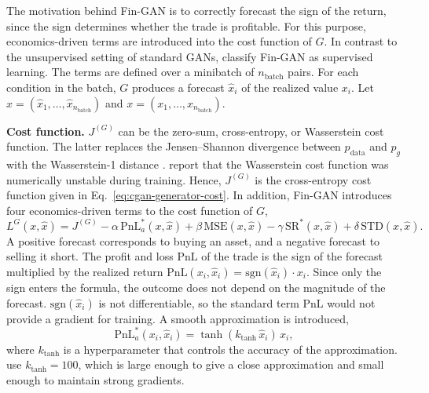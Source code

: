 The motivation behind Fin-GAN is to correctly forecast the sign of the return, since the sign determines whether the trade is profitable. For this purpose, economics-driven terms are introduced into the cost function of $G$. In contrast to the unsupervised setting of standard GANs, \textcite{vuleticFinGANForecastingClassifying2024} classify Fin-GAN as supervised learning. The terms are defined over a minibatch of $n_{\text{batch}}$ pairs. For each condition in the batch, $G$ produces a forecast $\hat{x}_i$ of the realized value $x_i$. Let $\hat{x}=(\hat{x}_1, \ldots, \hat{x}_{n_{\text{batch}}})$ and $x=(x_1, \ldots, x_{n_{\text{batch}}})$. 

\textbf{Cost function.} $J^{(G)}$ can be the zero-sum, cross-entropy, or Wasserstein cost function. The latter replaces the Jensen--Shannon divergence between $p_{\mathrm{data}}$ and $p_g$ with the Wasserstein-1 distance \parencite{arjovskyWassersteinGAN2017}. \textcite{vuleticFinGANForecastingClassifying2024} report that the Wasserstein cost function was numerically unstable during training. Hence, $J^{(G)}$ is the cross-entropy cost function given in Eq.~\eqref{eq:cgan-generator-cost}. In addition, Fin-GAN introduces four economics-driven terms to the cost function of $G$,
\begin{equation}
L^{G}(x, \hat{x}) = J^{(G)}
- \alpha\,\mathrm{PnL}^{*}_{a}(x, \hat{x})
+ \beta\,\mathrm{MSE}(x, \hat{x})
- \gamma\,\mathrm{SR}^{*}(x, \hat{x})
+ \delta\,\mathrm{STD}(x, \hat{x}).
\label{eq:fingan-loss}
\end{equation}
A positive forecast corresponds to buying an asset, and a negative forecast to selling it short. The profit and loss $\mathrm{PnL}$ of the trade is the sign of the forecast multiplied by the realized return $\mathrm{PnL}(x_i, \hat{x}_i)=\mathrm{sgn}(\hat{x}_i)\cdot x_i$. Since only the sign enters the formula, the outcome does not depend on the magnitude of the forecast. $\mathrm{sgn}(\hat{x}_i)$ is not differentiable, so the standard term $\mathrm{PnL}$ would not provide a gradient for training. A smooth approximation is introduced,
\begin{equation}
\mathrm{PnL}^{*}_{a}(x_i, \hat{x}_i) = \tanh(k_{\tanh}\,\hat{x}_i)\,x_i,
\end{equation}
where $k_{\tanh}$ is a hyperparameter that controls the accuracy of the approximation. \textcite{vuleticFinGANForecastingClassifying2024} use $k_{\tanh}=100$, which is large enough to give a close approximation and small enough to maintain strong gradients. 

